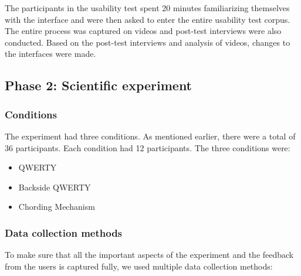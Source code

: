 The participants in the usability test spent 20 minutes familiarizing
themselves with the interface and were then asked to enter the entire
usability test corpus. The entire process was captured on videos and
post-test interviews were also conducted. Based on the post-test
interviews and analysis of videos, changes to the interfaces were
made.

\subsection{Phase 2: Scientific experiment}
\subsubsection{Conditions}

The experiment had three conditions. As mentioned earlier, there were
a total of 36 participants. Each condition had 12 participants. The
three conditions were:

\begin{itemize}
	\item QWERTY
	\item Backside QWERTY
	\item Chording Mechanism
\end{itemize}
\subsubsection{Data collection methods}

To make sure that all the important aspects of the experiment and the
feedback from the users is captured fully, we used multiple data
collection methods:

